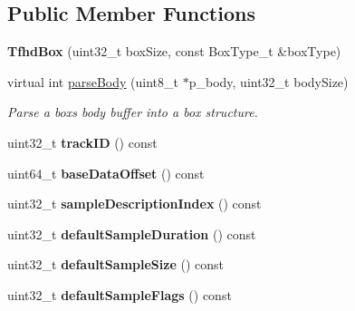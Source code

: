 \subsection*{Public Member Functions}
\begin{DoxyCompactItemize}
\item 
\mbox{\label{classmp4_parser_1_1_tfhd_box_a4299ec9db394485a0483b77175920d06}} 
{\bfseries Tfhd\+Box} (uint32\+\_\+t box\+Size, const Box\+Type\+\_\+t \&box\+Type)
\item 
virtual int \mbox{\hyperlink{classmp4_parser_1_1_tfhd_box_a9cbc2c42c59b678d13193fdb46a07314}{parse\+Body}} (uint8\+\_\+t $\ast$p\+\_\+body, uint32\+\_\+t body\+Size)
\begin{DoxyCompactList}\small\item\em Parse a box\textquotesingle{}s body buffer into a box structure. \end{DoxyCompactList}\item 
\mbox{\label{classmp4_parser_1_1_tfhd_box_aef7609e6ff5c78da3ff77d45f3a0e868}} 
uint32\+\_\+t {\bfseries track\+ID} () const
\item 
\mbox{\label{classmp4_parser_1_1_tfhd_box_a3db784941d829446e3ccfcab2e60868a}} 
uint64\+\_\+t {\bfseries base\+Data\+Offset} () const
\item 
\mbox{\label{classmp4_parser_1_1_tfhd_box_acd86d95a64596c7c854598c6456895c7}} 
uint32\+\_\+t {\bfseries sample\+Description\+Index} () const
\item 
\mbox{\label{classmp4_parser_1_1_tfhd_box_a3854e31ae66202d26ef21b494c7652f6}} 
uint32\+\_\+t {\bfseries default\+Sample\+Duration} () const
\item 
\mbox{\label{classmp4_parser_1_1_tfhd_box_ad7bef4fbbe52d8f5ecd4fc0e5a968f30}} 
uint32\+\_\+t {\bfseries default\+Sample\+Size} () const
\item 
\mbox{\label{classmp4_parser_1_1_tfhd_box_a20f6c9410b8a8e7e7921b11e1d528ff1}} 
uint32\+\_\+t {\bfseries default\+Sample\+Flags} () const
\item 

\end{DoxyCompactItemize}

